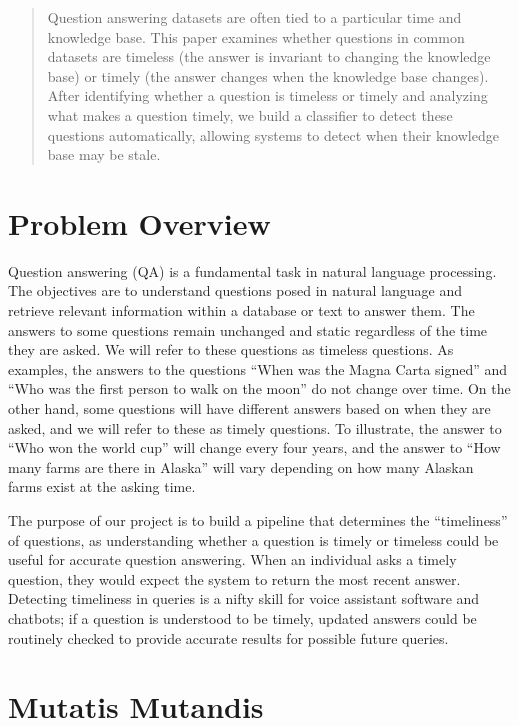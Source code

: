\documentclass{article}
\newcommand{\question}[1]{``#1''}
\begin{document}
\begin{abstract}
  Question answering datasets are often tied to a particular time and knowledge base.
  This paper examines whether questions in common  datasets
  are timeless (the answer is invariant to changing the knowledge
  base) or timely (the answer changes when the knowledge base
  changes).
  After identifying whether a question is timeless or timely and
  analyzing what makes a question timely, we build a classifier to
  detect these questions automatically, allowing  systems to
  detect when their knowledge base may be stale.
\end{abstract}

\section{Problem Overview}
\label{overview}
Question answering (QA) is a fundamental task in natural language processing.
The objectives are to understand questions posed in natural language and
retrieve relevant information within a database or text to answer them. The
answers to some questions remain unchanged and static regardless of the time
they are asked. We will refer to these questions as timeless questions. As
examples, the answers to the questions \question{When was the Magna Carta signed} and
\question{Who was the first person to walk on the moon} do not change over time. On the
other hand, some questions will have different answers based on when they are
asked, and we will refer to these as timely questions. To illustrate, the answer
to \question{Who won the world cup} will change every four years, and the answer to \question{How
many farms are there in Alaska} will vary depending on how many Alaskan farms
exist at the asking time.

The purpose of our project is to build a pipeline that determines the
``timeliness'' of questions, as understanding whether a question is timely or
timeless could be useful for accurate question answering. When an individual
asks a timely question, they would expect the system to return the most recent
answer. Detecting timeliness in queries is a nifty skill for voice assistant
software and chatbots; if a question is understood to be timely, updated answers
could be routinely checked to provide accurate results for possible future
queries.

\section{Mutatis Mutandis}
\label{sec:definition}
\end{document}
